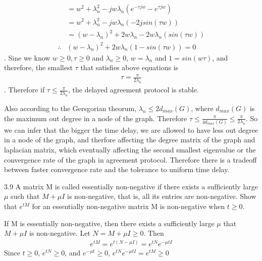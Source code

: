 \documentclass{article}
\begin{document}
\begin{problem}
\begin{align*}
        &= w^2 + \lambda_n^2 - jw\lambda_n(e^{-\tau jw}  - e^{\tau jw} ) \\
        &= w^2 + \lambda_n^2 - jw\lambda_n(-2jsin(\tau w)) \\
        &= (w-\lambda_n)^2 + 2w \lambda_n - 2w\lambda_n(sin(\tau w))\\
        \therefore &(w - \lambda_n)^2 + 2w\lambda_n(1-sin(\tau w)) = 0
    \end{align*}.
    Sine we know $w \geq 0, \tau \geq 0$ and $\lambda_n \geq 0$, $w = \lambda_n$ and $1 = sin(w\tau)$, and therefore, the smallest $\tau$ that satisfies above equations is
    \begin{align*}
        \tau = \frac{\pi}{2\lambda_n} 
    \end{align*}.
    Therefore if $\tau \leq \frac{\pi}{2\lambda_n}$, the delayed agreement protocol is stable.

    Also according to the Gersgorian theorum, $\lambda_n \leq 2 d_{max}(G)$, where $d_{max}(G)$ is the maximum out degree in a node of the graph. Therefore  $\tau \leq \frac{\pi}{4 d_{max}(G)}\leq \frac{\pi}{2\lambda_n}$. So we can infer that the bigger the time delay, we are allowed to have less out degree in a node of the graph, and therfore affecting the degree matrix of the graph and laplacian matrix, which eventually affecting the second smallest eigenvalue  or the convergence rate of the graph in agreement protocol. Therefore there is a tradeoff between faster convergence rate and the tolerance to uniform time delay. 
\end{problem}
\begin{problem} 3.9
    A matrix M is called essentially non-negative if there exists a sufﬁciently large $\mu$ such that $M + \mu I$ is non-negative, that is, all its entries are non-negative. Show that $e^{tM}$ for an essentially non-negative matrix M is non-negative when $t \geq 0.$

    If M is essentially non-negative, then there exists a sufficiently large $\mu$ that $M + \mu I$ is non-negative. Let $N = M + \mu I \geq 0$. Then 
    \begin{align*}
        e^{tM} = e^{t(N - \mu I)} = e^{tN}e^{-\mu  tI}
    \end{align*}
    Since $t \geq 0$, $e^{tN} \geq 0$, and $e^{-\mu t} \geq 0$, $e^{tN}e^{-\mu t I} = e^{tM} \geq 0$
\end{problem}
\end{document}
